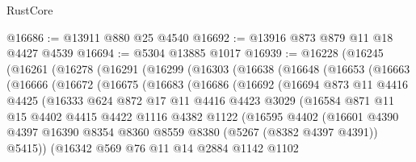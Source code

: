 \begin{lexlean}{RustCore}
\begin{coremodule}
@16686 := @13911 @880 @25 @4540
@16692 := @13916 @873 @879 @11 @18 @4427 @4539
@16694 := @5304 @13885 @1017
@16939 := @16228
    (@16245
      (@16261
        (@16278
          (@16291
            (@16299
              (@16303
                (@16638
                  (@16648
                    (@16653
                      (@16663
                        (@16666
                          (@16672
                            (@16675
                              (@16683
                                (@16686
                                  (@16692
                                    (@16694
                                      @873
                                      @11
                                      @4416
                                      @4425
                                      (@16333
                                        @624
                                        @872
                                        @17
                                        @11
                                        @4416
                                        @4423
                                        @3029
                                        (@16584
                                          @871
                                          @11
                                          @15
                                          @4402
                                          @4415
                                          @4422
                                          @1116
                                          @4382
                                          @1122
                                          (@16595
                                            @4402
                                            (@16601
                                              @4390
                                              @4397
                                              @16390
                                              @8354
                                              @8360
                                              @8559
                                              @8380
                                              (@5267 (@8382 @4397 @4391))
                                              @5415))
                                          (@16342
                                            @569
                                            @76
                                            @11
                                            @14
                                            @2884
                                            @1142
                                            @1102

\end{coremodule}
\end{lexlean}

